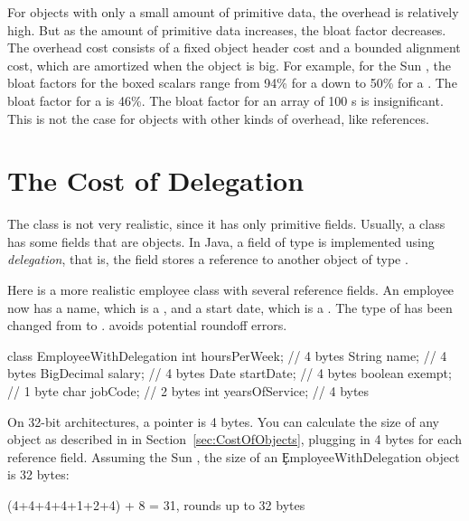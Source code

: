 For objects with only a small amount of primitive data, the overhead is relatively high. 
But as the amount of primitive data increases, the bloat factor decreases. 
The overhead cost consists of a fixed object header cost and a bounded alignment cost, which are amortized when the object is big.  For example, for the Sun \jre, the bloat factors for the boxed
scalars range from 94\% for a  down to 50\% for a
.  The bloat factor for a  is 46\%.  The
bloat factor for an array of 100 s is insignificant. This is not the
case for objects with other kinds of overhead, like references.

\section{The Cost of Delegation}

The  class is not very realistic, since it has only
primitive fields. Usually, a class has some fields that are objects. In Java,
a field of type  is implemented using \textit{delegation},
that is, the field stores a reference to another object of type
. 

Here is a more realistic employee class with several reference fields. An
employee now has a name, which is a , and a start date, which is a
. The type of  has been changed from 
to .  avoids potential roundoff errors.
\begin{shortlisting} 
class EmployeeWithDelegation {
    int hoursPerWeek;           // 4 bytes
    String name;                // 4 bytes
    BigDecimal salary;          // 4 bytes
    Date startDate;             // 4 bytes
    boolean exempt;             // 1 byte
    char jobCode;               // 2 bytes
    int yearsOfService;         // 4 bytes
}
\end{shortlisting}

On 32-bit architectures, a pointer is 4 bytes. You can
calculate the size of any object as described in in
Section~\ref{sec:CostOfObjects}, plugging in 4 bytes for each reference field. Assuming the Sun \jre,
the size of an \c{EmployeeWithDelegation} object is 32 bytes:
\begin{shortlisting}
(4+4+4+4+1+2+4) + 8 = 31, rounds up to 32 bytes
\end{shortlisting}

